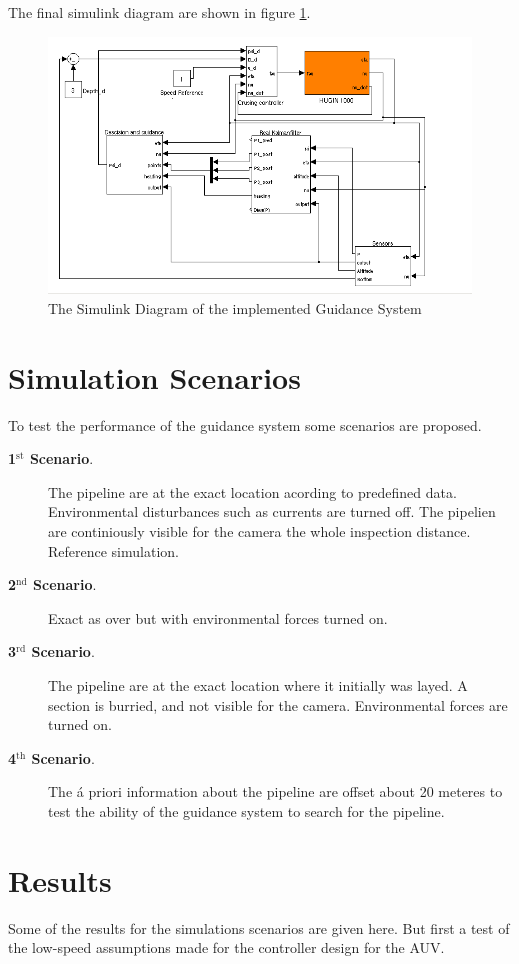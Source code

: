 	The final simulink diagram are shown in figure \ref{fig:ch3_simulink}.
	\begin{figure}[htbp]
		\centering
		\includegraphics[width=\textwidth]{pics/simulink}
		\caption{The Simulink Diagram of the implemented Guidance System}
		\label{fig:ch3_simulink}
	\end{figure}

	

\section{Simulation Scenarios}
	To test the performance of the guidance system some scenarios are proposed.
	\begin{description}
		\item[\textbf{1$^{\mathrm{st}}$ Scenario}.] The pipeline are at the exact location acording 
		to predefined data. Environmental disturbances such as currents are turned off. The pipelien are
		continiously visible for the camera the whole inspection distance. Reference simulation.
		\item[\textbf{2$^{\mathrm{nd}}$ Scenario}.] Exact as over but with environmental forces turned on.
		\item[\textbf{3$^{\mathrm{rd}}$ Scenario}.] The pipeline are at the exact location where 
		it initially was layed. A section is burried, and not visible for the camera. Environmental
		forces are turned on.
		\item[\textbf{4$^{\mathrm{th}}$ Scenario}.] The \'a priori information about the pipeline 
		are offset about 20 meteres to test the ability of the guidance system to search for the pipeline.
	\end{description}


\section{Results}
	Some of the results for the simulations scenarios are given here. But first a test of the low-speed
	assumptions made for the controller design for the AUV. 


